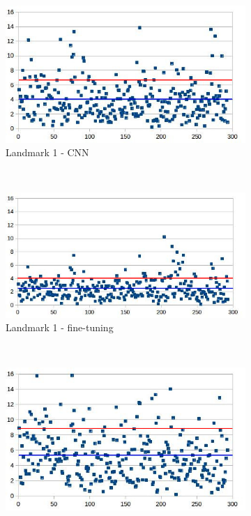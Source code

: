 \documentclass[10pt]{article}
\begin{document}
\begin{figure}[htbp]
   
    \begin{subfigure}[t]{0.25\textwidth}
        \centering
        \includegraphics[scale=.33]{images/lm1_cnn_2}
        \caption{\small{Landmark 1 - CNN}}
        \label{figsub11}
    \end{subfigure}%
    ~ 
    \begin{subfigure}[t]{0.25\textwidth}
        \centering
        \includegraphics[scale=.32]{images/lm1_finetuning_2}
        \caption{\small{Landmark 1 - fine-tuning}}
        \label{figsub22}
    \end{subfigure}~\\
    \begin{subfigure}[t]{0.25\textwidth}
        \centering
        \includegraphics[scale=.33]{images/lm6_cnn_2}

\end{subfigure}
\end{figure}
\end{document}
